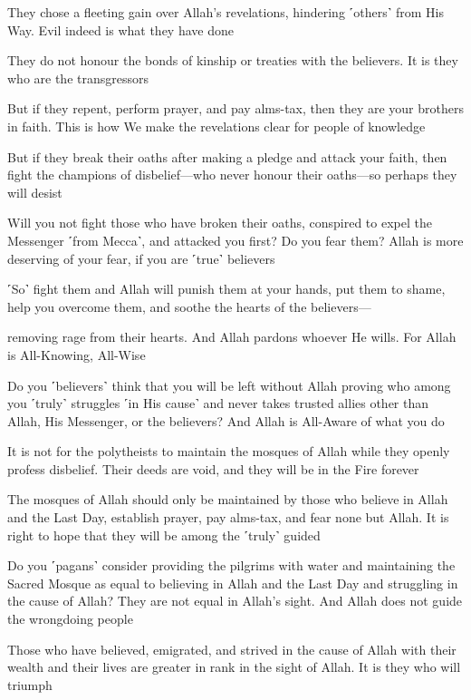 They chose a fleeting gain over Allah’s revelations, hindering ˹others˺ from His Way. Evil indeed is what they have done

They do not honour the bonds of kinship or treaties with the believers. It is they who are the transgressors

But if they repent, perform prayer, and pay alms-tax, then they are your brothers in faith. This is how We make the revelations clear for people of knowledge

But if they break their oaths after making a pledge and attack your faith, then fight the champions of disbelief—who never honour their oaths—so perhaps they will desist

Will you not fight those who have broken their oaths, conspired to expel the Messenger ˹from Mecca˺, and attacked you first? Do you fear them? Allah is more deserving of your fear, if you are ˹true˺ believers

˹So˺ fight them and Allah will punish them at your hands, put them to shame, help you overcome them, and soothe the hearts of the believers—

removing rage from their hearts. And Allah pardons whoever He wills. For Allah is All-Knowing, All-Wise

Do you ˹believers˺ think that you will be left without Allah proving who among you ˹truly˺ struggles ˹in His cause˺ and never takes trusted allies other than Allah, His Messenger, or the believers? And Allah is All-Aware of what you do

It is not for the polytheists to maintain the mosques of Allah while they openly profess disbelief. Their deeds are void, and they will be in the Fire forever

The mosques of Allah should only be maintained by those who believe in Allah and the Last Day, establish prayer, pay alms-tax, and fear none but Allah. It is right to hope that they will be among the ˹truly˺ guided

Do you ˹pagans˺ consider providing the pilgrims with water and maintaining the Sacred Mosque as equal to believing in Allah and the Last Day and struggling in the cause of Allah? They are not equal in Allah’s sight. And Allah does not guide the wrongdoing people

Those who have believed, emigrated, and strived in the cause of Allah with their wealth and their lives are greater in rank in the sight of Allah. It is they who will triumph

